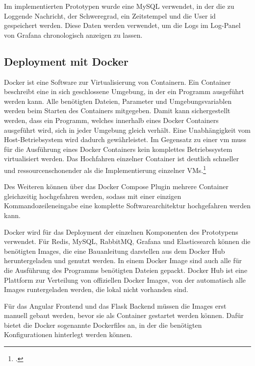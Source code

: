 Im implementierten Prototypen wurde eine MySQL verwendet, in der die zu Loggende Nachricht, der Schweregrad, ein Zeitstempel und die User \ac{id} gespeichert werden. Diese Daten werden verwendet, um die Logs im Log-Panel von Grafana chronologisch anzeigen zu lassen.

\subsection{Deployment mit Docker}
Docker ist eine Software zur Virtualisierung von Containern. Ein Container beschreibt eine in sich geschlossene Umgebung, in der ein Programm ausgeführt werden kann. Alle benötigten Dateien, Parameter und Umgebungsvariablen werden beim Starten des Containers mitgegeben. Damit kann sichergestellt werden, dass ein Programm, welches innerhalb eines Docker Containers ausgeführt wird, sich in jeder Umgebung gleich verhält. Eine Unabhängigkeit vom Host-Betriebsystem wird dadurch gewährleistet. Im Gegensatz zu einer \ac{vm} muss für die Ausführung eines Docker Containers kein komplettes Betriebssystem virtualisiert werden. Das Hochfahren einzelner Container ist deutlich schneller und ressourcenschonender als die Implementierung einzelner VMs.\footcite{anderson2015docker}

Des Weiteren können über das Docker Compose Plugin mehrere Container gleichzeitig hochgefahren werden, sodass mit einer einzigen Kommandozeileneingabe eine komplette Softwarearchitektur hochgefahren werden kann.

Docker wird für das Deployment der einzelnen Komponenten des Prototypens verwendet. Für Redis, MySQL, RabbitMQ, Grafana und Elasticsearch können die benötigten Images, die eine Bauanleitung darstellen aus dem Docker Hub heruntergeladen und genutzt werden. In einem Docker Image sind auch alle für die Ausführung des Programms benötigten Dateien gepackt. Docker Hub ist eine Plattform zur Verteilung von offiziellen Docker Images, von der automatisch alle Images runtergeladen werden, die lokal nicht vorhanden sind.

Für das Angular Frontend und das Flask Backend müssen die Images erst manuell gebaut werden, bevor sie als Container gestartet werden können. Dafür bietet die Docker sogenannte Dockerfiles an, in der die benötigten Konfigurationen hinterlegt werden können.

